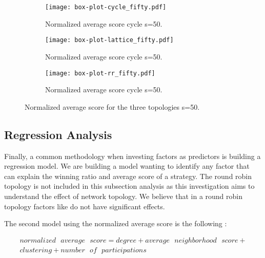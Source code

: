 \begin{figure}[!htbp]
\centering
    \begin{subfigure}[t]{1\textwidth}
    \centering
        \texttt{[image: box-plot-cycle\_fifty.pdf]}
    \caption{Normalized average score cycle s=50.}
    \end{subfigure}
\hfill
    \begin{subfigure}[t]{1\textwidth}\centering
    \centering
        \texttt{[image: box-plot-lattice\_fifty.pdf]}
    \caption{Normalized average score cycle s=50.}
    \end{subfigure}
\hfill
    \begin{subfigure}[t]{1\textwidth}\centering
    \centering
        \texttt{[image: box-plot-rr\_fifty.pdf]}
    \caption{Normalized average score cycle s=50.}
    \end{subfigure}
\caption{Normalized average score for the three topologies s=50.}
\label{fig:average-score-fifty}
\end{figure}


\subsection{Regression Analysis}

Finally, a common methodology when investing factors as predictors is building a
regression model. We are building a model wanting to identify any factor that can
explain the winning ratio and  average score of a strategy. The round robin
topology is not included in this subsection analysis as this investigation aims
to understand the effect of network topology. We believe
that in a round robin topology factors like do not have significant effects.

The second model using the normalized average score is the following :

\begin{equation}\label{regmodel}
\begin{split}
normalized\textrm{ }average\textrm{ }score = degree + average\textrm{ }neighborhood\textrm{ }score + \\
clustering + number\textrm{ }of\textrm{ }participations
\end{split}
\end{equation}

